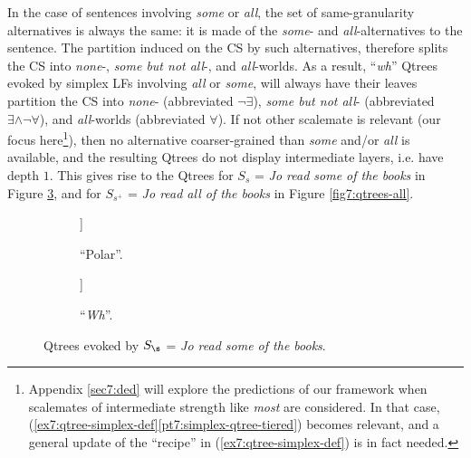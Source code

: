 In the case of sentences involving \textit{some} or \textit{all}, the set of same-granularity alternatives is always the same: it is made of the \textit{some}- and \textit{all}-alternatives to the sentence. The partition induced on the CS by such alternatives, therefore splits the CS into \textit{none}-, \textit{some but not all}-, and \textit{all}-worlds. As a result, ``\textit{wh}'' Qtrees evoked by simplex LFs involving \textit{all} or \textit{some}, will always have their leaves partition the CS into \textit{none}- (abbreviated $\neg\exists$), \textit{some but not all}- (abbreviated $\exists\wedge\neg\forall$), and \textit{all}-worlds (abbreviated $\forall$). If not other scalemate is relevant (our focus here\footnote{Appendix \ref{sec7:ded} will explore the predictions of our framework when scalemates of intermediate strength like \textit{most} are considered. In that case, (\ref{ex7:qtree-simplex-def}\ref{pt7:simplex-qtree-tiered}) becomes relevant, and a general update of the ``recipe'' in (\ref{ex7:qtree-simplex-def}) is in fact needed.}), then no alternative coarser-grained than \textit{some} and/or \textit{all} is available, and the resulting Qtrees do not display intermediate layers, i.e. have depth $1$. This gives rise to the Qtrees for $S_{s}$ = \textit{Jo read some of the books} in Figure \ref{fig7:qtrees-some}, and for $S_{s^+}$ = \textit{Jo read all of the books} in Figure \ref{fig7:qtrees-all}. 

\begin{figure}[H]
	\centering
	\begin{subfigure}[b]{.45\linewidth}
		\centering
		\begin{forest}
			[CS[$\neg\exists$][\fbox{$\exists$}]]
		\end{forest}
		\caption[]{``Polar''.}\label{fig7:qtree-some-polar}
	\end{subfigure}
	\hfill
	\begin{subfigure}[b]{.45\linewidth}
		\centering
		\begin{forest}
			[CS[$\neg\exists$][\fbox{$\exists\wedge\neg\forall$}][\fbox{$\forall$}]]
		\end{forest}
		\caption[]{``\textit{Wh}''.}\label{fig7:qtree-some-wh}
	\end{subfigure}
	\caption[]{Qtrees evoked by $S_{\s}$ = \textit{Jo read some of the books}. }\label{fig7:qtrees-some}
\end{figure}


